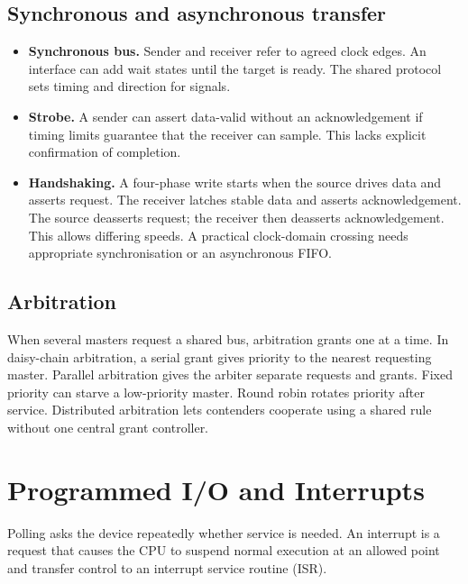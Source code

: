 \documentclass[12pt,a4paper]{article}
\begin{document}
\subsection{Synchronous and asynchronous transfer}
\begin{itemize}[leftmargin=*,itemsep=3pt]
\item \textbf{Synchronous bus.} Sender and receiver refer to agreed clock edges. An interface can add wait states until the target is ready. The shared protocol sets timing and direction for signals.
\item \textbf{Strobe.} A sender can assert data-valid without an acknowledgement if timing limits guarantee that the receiver can sample. This lacks explicit confirmation of completion.
\item \textbf{Handshaking.} A four-phase write starts when the source drives data and asserts request. The receiver latches stable data and asserts acknowledgement. The source deasserts request; the receiver then deasserts acknowledgement. This allows differing speeds. A practical clock-domain crossing needs appropriate synchronisation or an asynchronous FIFO.
\end{itemize}
\subsection{Arbitration}
When several masters request a shared bus, arbitration grants one at a time. In daisy-chain arbitration, a serial grant gives priority to the nearest requesting master. Parallel arbitration gives the arbiter separate requests and grants. Fixed priority can starve a low-priority master. Round robin rotates priority after service. Distributed arbitration lets contenders cooperate using a shared rule without one central grant controller.

\section{Programmed I/O and Interrupts}
\begin{tcolorbox}[defbox,title={Polling and interrupt}]
Polling asks the device repeatedly whether service is needed. An interrupt is a request that causes the CPU to suspend normal execution at an allowed point and transfer control to an interrupt service routine (ISR).
\end{tcolorbox}
\end{document}
